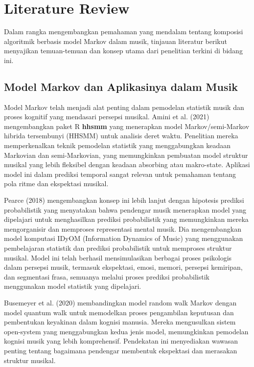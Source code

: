 \documentclass[a4paper,12pt]{article}
\begin{document}
\section*{Literature Review}

Dalam rangka mengembangkan pemahaman yang mendalam tentang komposisi algoritmik berbasis model Markov dalam musik, tinjauan literatur berikut menyajikan temuan-temuan dan konsep utama dari penelitian terkini di bidang ini.

\subsection*{Model Markov dan Aplikasinya dalam Musik}

Model Markov telah menjadi alat penting dalam pemodelan statistik musik dan proses kognitif yang mendasari persepsi musikal. Amini et al. (2021) mengembangkan paket R \textbf{hhsmm} yang menerapkan model Markov/semi-Markov hibrida tersembunyi (HHSMM) untuk analisis deret waktu. Penelitian mereka memperkenalkan teknik pemodelan statistik yang menggabungkan keadaan Markovian dan semi-Markovian, yang memungkinkan pembuatan model struktur musikal yang lebih fleksibel dengan keadaan absorbing atau makro-state. Aplikasi model ini dalam prediksi temporal sangat relevan untuk pemahaman tentang pola ritme dan ekspektasi musikal.

Pearce (2018) mengembangkan konsep ini lebih lanjut dengan hipotesis prediksi probabilistik yang menyatakan bahwa pendengar musik menerapkan model yang dipelajari untuk menghasilkan prediksi probabilistik yang memungkinkan mereka mengorganisir dan memproses representasi mental musik. Dia mengembangkan model komputasi IDyOM (Information Dynamics of Music) yang menggunakan pembelajaran statistik dan prediksi probabilistik untuk memproses struktur musikal. Model ini telah berhasil mensimulasikan berbagai proses psikologis dalam persepsi musik, termasuk ekspektasi, emosi, memori, persepsi kemiripan, dan segmentasi frasa, semuanya melalui proses prediksi probabilistik menggunakan model statistik yang dipelajari.

Busemeyer et al. (2020) membandingkan model random walk Markov dengan model quantum walk untuk memodelkan proses pengambilan keputusan dan pembentukan keyakinan dalam kognisi manusia. Mereka mengusulkan sistem open-system yang menggabungkan kedua jenis model, memungkinkan pemodelan kognisi musik yang lebih komprehensif. Pendekatan ini menyediakan wawasan penting tentang bagaimana pendengar membentuk ekspektasi dan merasakan struktur musikal.
\end{document}
